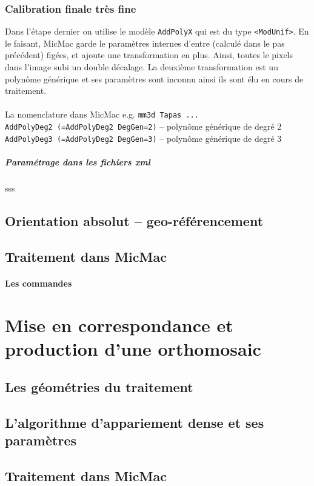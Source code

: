 \documentclass[11pt,a4paper,oneside]{book}
\begin{document}
\subsection{Calibration finale très fine}
%
Dans l'étape dernier on utilise le modèle {\tt AddPolyX} qui est du type {\tt <ModUnif>}. En le faisant, MicMac garde le paramètres internes d'entre (calculé dans le pas précédent) figées, et ajoute une transformation en plus. Ainsi, toutes le pixels dans l'image subi un double décalage. La deuxième transformation est un polynôme générique et ses paramètres sont inconnu ainsi ils sont élu en cours de traitement.
\\
\\
La nomenclature dans MicMac e.g. {\tt mm3d Tapas ...}\\
{\tt AddPolyDeg2 (=AddPolyDeg2 DegGen=2)} – polynôme générique de degré 2\\ 
{\tt AddPolyDeg3 (=AddPolyDeg2 DegGen=3)} – polynôme générique de degré 3 
%
\paragraph{Paramétrage dans les fichiers xml}
%
sss
%
\section{Orientation absolut -- geo-référencement}

\section{Traitement dans MicMac}



\subsubsection{Les commandes}

\chapter{Mise en correspondance et production d'une orthomosaic}

\section{Les géométries du traitement}
\section{L’algorithme d'appariement dense et ses paramètres}
\section{Traitement dans MicMac}
\end{document}

